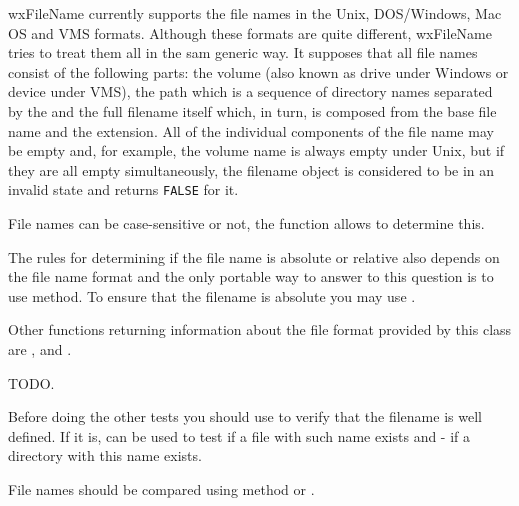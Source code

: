 

wxFileName currently supports the file names in the Unix, DOS/Windows, Mac OS
and VMS formats. Although these formats are quite different, wxFileName tries
to treat them all in the sam generic way. It supposes that all file names
consist of the following parts: the volume (also known as drive under Windows
or device under VMS), the path which is a sequence of directory names separated
by the  and the full
filename itself which, in turn, is composed from the base file name and the
extension. All of the individual components of the file name may be empty and,
for example, the volume name is always empty under Unix, but if they are all
empty simultaneously, the filename object is considered to be in an invalid
state and  returns {\tt FALSE} for it.

File names can be case-sensitive or not, the function\rtfsp
{} allows to determine this.

The rules for determining if the file name is absolute or relative also depends
on the file name format and the only portable way to answer to this question is
to use  method. To ensure that the
filename is absolute you may use .

Other functions returning information about the file format provided by this
class are ,\rtfsp
{} and\rtfsp
{}.



TODO.


Before doing the other tests you should use  to
verify that the filename is well defined. If it is, 
 can be used to test if a file with
such name exists and  - if a directory
with this name exists.

File names should be compared using  method
or .

